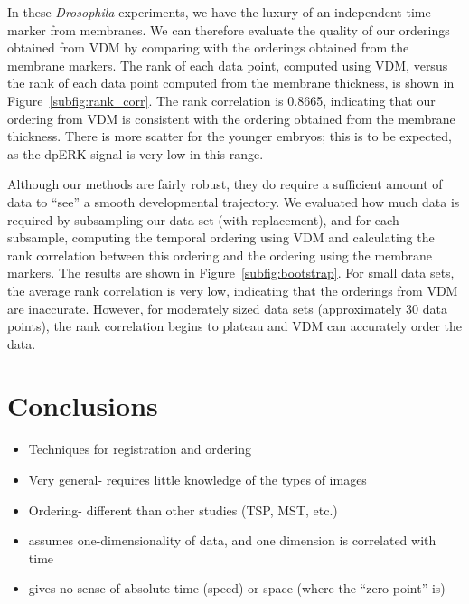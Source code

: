 \documentclass{pnastwo}
\begin{document}
\begin{article}
In these {\em Drosophila} experiments, we have the luxury of an independent time marker from membranes.
%
We can therefore evaluate the quality of our orderings obtained from VDM by comparing with the orderings obtained from the membrane markers.
%
The rank of each data point, computed using VDM, versus the rank of each data point computed from the membrane thickness, is shown in Figure~\ref{subfig:rank_corr}.
%
The rank correlation is 0.8665, indicating that our ordering from VDM is consistent with the ordering obtained from the membrane thickness.
%
There is more scatter for the younger embryos; this is to be expected, as the dpERK signal is very low in this range.

Although our methods are fairly robust, they do require a sufficient amount of data to ``see'' a smooth developmental trajectory.
%
We evaluated how much data is required by subsampling our data set (with replacement), and for each subsample, computing the temporal ordering using VDM and calculating the rank correlation between this ordering and the ordering using the membrane markers.
%
The results are shown in Figure~\ref{subfig:bootstrap}.
%
For small data sets, the average rank correlation is very low, indicating that the orderings from VDM are inaccurate. 
%
However, for moderately sized data sets (approximately 30 data points), the 
rank correlation begins to plateau and VDM can accurately order the data.

\section{Conclusions}

\begin{itemize}

\item Techniques for registration and ordering
\item Very general- requires little knowledge of the types of images
\item Ordering- different than other studies (TSP, MST, etc.)
\item assumes one-dimensionality of data, and one dimension is correlated with time
\item gives no sense of absolute time (speed) or space (where the ``zero point'' is)
\end{itemize}





\end{article}
\end{document}
